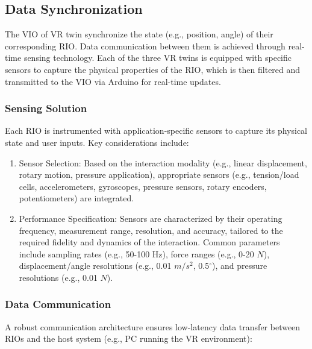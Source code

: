 \documentclass[runningheads]{llncs}
\begin{document}
\subsection{Data Synchronization}
The VIO of VR twin synchronize the state (e.g., position, angle) of their corresponding RIO. Data communication between them is achieved through real-time sensing technology. Each of the three VR twins is equipped with specific sensors to capture the physical properties of the RIO, which is then filtered and transmitted to the VIO via Arduino for real-time updates.

\subsubsection{Sensing Solution}
Each RIO is instrumented with application-specific sensors to capture its physical state and user inputs. Key considerations include:
\begin{enumerate}
  \item Sensor Selection: Based on the interaction modality (e.g., linear displacement, rotary motion, pressure application), appropriate sensors (e.g., tension/load cells, accelerometers, gyroscopes, pressure sensors, rotary encoders, potentiometers) are integrated.

  \item Performance Specification: Sensors are characterized by their operating frequency, measurement range, resolution, and accuracy, tailored to the required fidelity and dynamics of the interaction. Common parameters include sampling rates (e.g., 50-100 Hz), force ranges (e.g., 0-20 $N$), displacement/angle resolutions (e.g., 0.01 $m/s^2$, 0.5$^\circ$), and pressure resolutions (e.g., 0.01 $N$).
\end{enumerate}

\subsubsection{Data Communication}
A robust communication architecture ensures low-latency data transfer between RIOs and the host system (e.g., PC running the VR environment):
\end{document}
